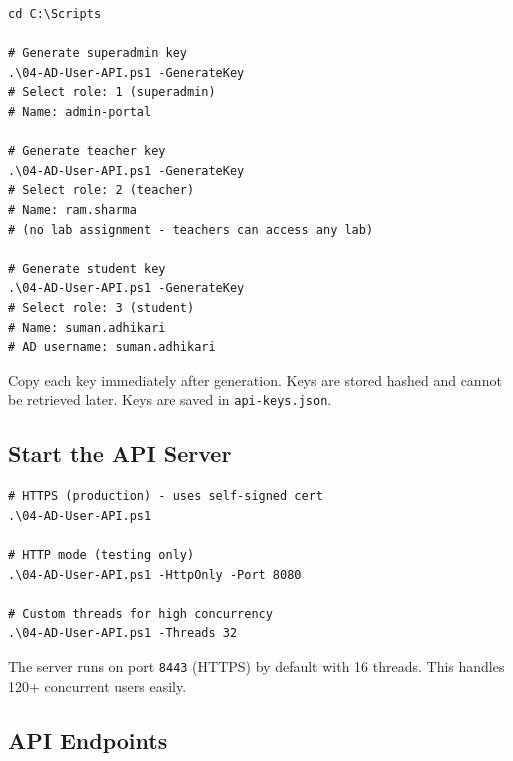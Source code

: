 ﻿\documentclass[12pt,a4paper]{article}
\begin{document}
\begin{lstlisting}
cd C:\Scripts

# Generate superadmin key
.\04-AD-User-API.ps1 -GenerateKey
# Select role: 1 (superadmin)
# Name: admin-portal

# Generate teacher key
.\04-AD-User-API.ps1 -GenerateKey
# Select role: 2 (teacher)
# Name: ram.sharma
# (no lab assignment - teachers can access any lab)

# Generate student key
.\04-AD-User-API.ps1 -GenerateKey
# Select role: 3 (student)
# Name: suman.adhikari
# AD username: suman.adhikari
\end{lstlisting}

\begin{warningbox}
Copy each key immediately after generation. Keys are stored hashed and cannot be retrieved later. Keys are saved in \texttt{api-keys.json}.
\end{warningbox}

\subsection{Start the API Server}

\begin{lstlisting}
# HTTPS (production) - uses self-signed cert
.\04-AD-User-API.ps1

# HTTP mode (testing only)
.\04-AD-User-API.ps1 -HttpOnly -Port 8080

# Custom threads for high concurrency
.\04-AD-User-API.ps1 -Threads 32
\end{lstlisting}

The server runs on port \texttt{8443} (HTTPS) by default with 16 threads. This handles 120+ concurrent users easily.

\subsection{API Endpoints}
\end{document}

